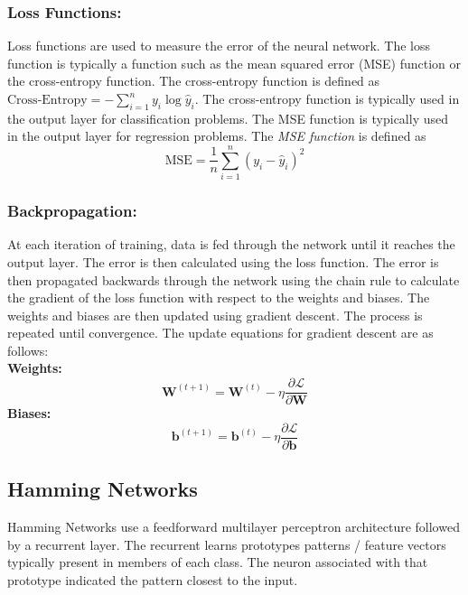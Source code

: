 \subsubsection{Loss Functions:} Loss functions are used to measure the error of the neural network. The loss function is typically a function such as the mean squared error (MSE) function or the cross-entropy function. The cross-entropy function is defined as \(\text{Cross-Entropy}=-\sum_{i=1}^{n}y_i\log{\hat{y}_i}\). The cross-entropy function is typically used in the output layer for classification problems. The MSE function is typically used in the output layer for regression problems. The \emph{MSE function} is defined as \[\text{MSE}=\frac{1}{n}\sum_{i=1}^{n}(y_i-\hat{y}_i)^2\]
\subsubsection{Backpropagation:} At each iteration of training, data is fed through the network until it reaches the output layer. The error is then calculated using the loss function. The error is then propagated backwards through the network using the chain rule to calculate the gradient of the loss function with respect to the weights and biases. The weights and biases are then updated using gradient descent. The process is repeated until convergence. The update equations for gradient descent are as follows:\\
\textbf{Weights:} \[\mathbf{W}^{(t+1)}=\mathbf{W}^{(t)}-\eta\frac{\partial\mathcal{L}}{\partial\mathbf{W}}\] 
\textbf{Biases:} \[\mathbf{b}^{(t+1)}=\mathbf{b}^{(t)}-\eta\frac{\partial\mathcal{L}}{\partial\mathbf{b}}\]
\subsection{Hamming Networks}
Hamming Networks use a feedforward multilayer perceptron architecture followed by a recurrent layer. The recurrent learns prototypes patterns / feature vectors typically present in members of each class. The neuron associated with that prototype indicated the pattern closest to the input.
